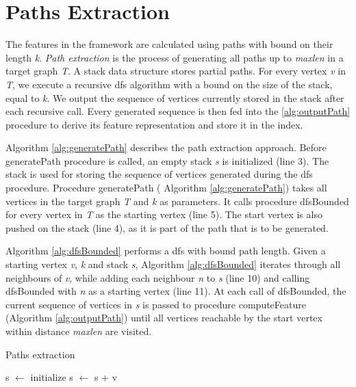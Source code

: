 \documentclass{l4proj}
\begin{document}
\section{Paths Extraction}
\label{sec:pathsExtraction}
The features in the framework are calculated using paths with bound on their length \emph{k}. \emph{Path extraction} is the process of generating all paths up to \emph{maxlen} in a target graph \emph{T}. A stack data structure stores partial paths. For every vertex \emph{v} in \emph{T}, we execute a recursive \gls{dfs} algorithm with a bound on the size of the stack, equal to \emph{k}. We output the sequence of vertices currently stored in the stack after each recursive call. Every generated sequence is then fed into the \ref{alg:outputPath} procedure to derive its feature representation and store it in the index.

Algorithm \ref{alg:generatePath} describes the path extraction approach. Before generatePath procedure is called, an empty stack \emph{s} is initialized (line 3). The stack is used for storing the sequence of vertices generated during the \gls{dfs} procedure. Procedure generatePath ( \textrm{Algorithm \ref{alg:generatePath}}) takes all vertices in the target graph \emph{T} and \emph{k} as parameters. It calls procedure dfsBounded for every vertex in \emph{T} as the starting vertex (line 5). The start vertex is also pushed on the stack (line 4), as it is part of the path that is to be generated.

Algorithm \ref{alg:dfsBounded} performs a \gls{dfs} with bound path length. Given a starting vertex \emph{v}, \emph{k} and stack \emph{s}, Algorithm \ref{alg:dfsBounded} iterates through all neighbours of \emph{v}, while adding each neighbour \emph{n} to \emph{s} (line 10) and calling dfsBounded with \emph{n} as a starting vertex (line 11). At each call of dfsBounded, the current sequence of vertices in \emph{s} is passed to procedure computeFeature (Algorithm \ref{alg:outputPath}) until all vertices reachable by the start vertex within distance \emph{maxlen} are visited.

\begin{algorithm}
\centering
\caption{Paths extraction}
\label{alg:generatePath}
\begin{algorithmic}[1]
	\State s $\gets$ initialize 
	\State s $\gets$ s + v 
	\State {}
\EndFor
\EndProcedure
\end{algorithmic}
\end{algorithm}
\end{document}
